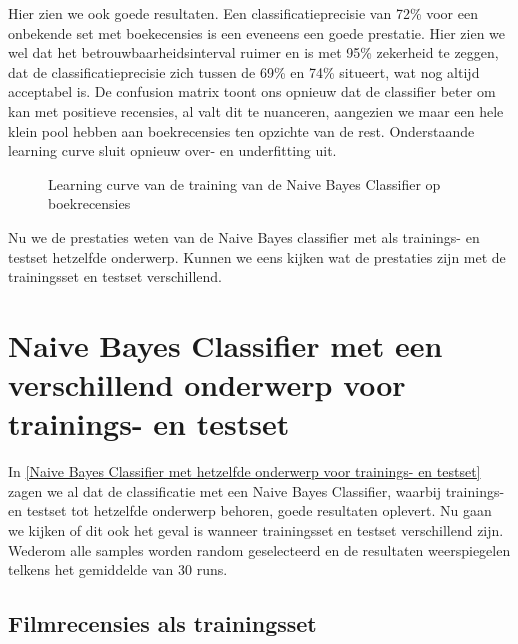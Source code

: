 Hier zien we ook goede resultaten. Een classificatieprecisie van 72\% voor een onbekende set met boekecensies is een eveneens een goede prestatie. Hier zien we wel dat het betrouwbaarheidsinterval ruimer en is met 95\% zekerheid te zeggen, dat de classificatieprecisie zich tussen de 69\% en 74\% situeert, wat nog altijd acceptabel is. De confusion matrix toont ons opnieuw dat de classifier beter om kan met positieve recensies, al valt dit te nuanceren, aangezien we maar een hele klein pool hebben aan boekrecensies ten opzichte van de rest. Onderstaande learning curve sluit opnieuw over- en underfitting uit.\\
\newpage
\begin{figure}%
    \centering
    \label{fig:lc-boek-boek}
    \caption{Learning curve van de training van de Naive Bayes Classifier op boekrecensies}
\end{figure}

Nu we de prestaties weten van de Naive Bayes classifier met als trainings- en testset hetzelfde onderwerp. Kunnen we eens kijken wat de prestaties zijn met de trainingsset en testset verschillend.  

\section{Naive Bayes Classifier met een verschillend onderwerp voor trainings- en testset}\label{Naive Bayes Classifier met verschillend onderwerp voor trainings- en testset}

In \ref{Naive Bayes Classifier met hetzelfde onderwerp voor trainings- en testset} zagen we al dat de classificatie met een Naive Bayes Classifier, waarbij trainings- en testset tot hetzelfde onderwerp behoren, goede resultaten oplevert. Nu gaan we kijken of dit ook het geval is wanneer trainingsset en testset verschillend zijn. Wederom alle samples worden random geselecteerd en de resultaten weerspiegelen telkens het gemiddelde van 30 runs.  

\subsection{Filmrecensies als trainingsset}\label{Filmrecensies als trainingsset}


